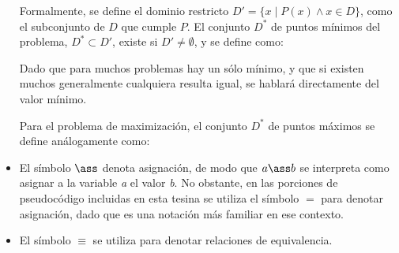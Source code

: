 \begin{itemize}
Formalmente, se define el dominio restricto $D'=\{ x \; | \;P(x) \wedge x \in D \}$, como el subconjunto de $D$ que cumple $P$.  El conjunto $D^*$ de puntos mínimos del problema, $D^* \subset D'$, existe si $D'\neq \emptyset$, y se define como:


Dado que para muchos problemas hay un sólo mínimo, y que si existen muchos generalmente cualquiera resulta igual, se hablará directamente del valor mínimo.

Para el problema de maximización, el conjunto $D^*$ de puntos máximos se define análogamente como:
 

\item El símbolo $\ass$ denota asignación, de modo que $ a \ass b$ se interpreta como asignar a la variable \textit{a} el valor \textit{b}. No obstante, en las porciones de pseudocódigo incluidas en esta tesina se utiliza el símbolo $=$ para denotar asignación, dado que es una notación más familiar en ese contexto.

\item El símbolo $\equiv$ se utiliza para denotar relaciones de equivalencia.

\end{itemize}